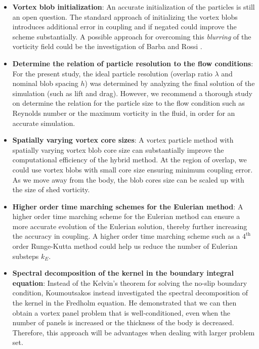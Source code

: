 \begin{itemize}

\item \textbf{Vortex blob initialization}: An accurate initialization of the particles is still an open question. The standard approach of initializing the vortex blobs introduces additional error in coupling and if negated could improve the scheme substantially. A possible approach for overcoming this \textit{blurring} of the vorticity field could be the investigation of Barba and Rossi \cite{Barba2010a}.

\item \textbf{Determine the relation of particle resolution to the flow conditions}: For the present study, the ideal particle resolution (overlap ratio $\lambda$ and nominal blob spacing $h$) was determined by analyzing the final solution of the simulation (such as lift and drag). However, we recommend a thorough study on determine the relation for the particle size to the flow condition such as Reynolds number or the maximum vorticity in the fluid, in order for an accurate simulation.

\item \textbf{Spatially varying vortex core sizes}: A vortex particle method with spatially varying vortex blob core size can substantially improve the computational efficiency of the hybrid method. At the region of overlap, we could use vortex blobs with small core size ensuring minimum coupling error. As we move away from the body, the blob cores size can be scaled up with the size of shed vorticity.

\item \textbf{Higher order time marching schemes for the Eulerian method}: A higher order time marching scheme for the Eulerian method can ensure a more accurate evolution of the Eulerian solution, thereby further increasing the accuracy in coupling. A higher order time marching scheme such as a $4^{\mathrm{th}}$ order Runge-Kutta method could help us reduce the number of Eulerian substeps $k_E$.

\item \textbf{Spectral decomposition of the kernel in the boundary integral equation}: Instead of the Kelvin's theorem for solving the no-slip boundary condition, Koumoutsakos \cite{Koumoutsakos1993a} instead investigated the spectral decomposition of the kernel in the Fredholm equation. He demonstrated that we can then obtain a vortex panel problem that is well-conditioned, even when the number of panels is increased or the thickness of the body is decreased. Therefore, this approach will be advantages when dealing with larger problem set.


\end{itemize}
